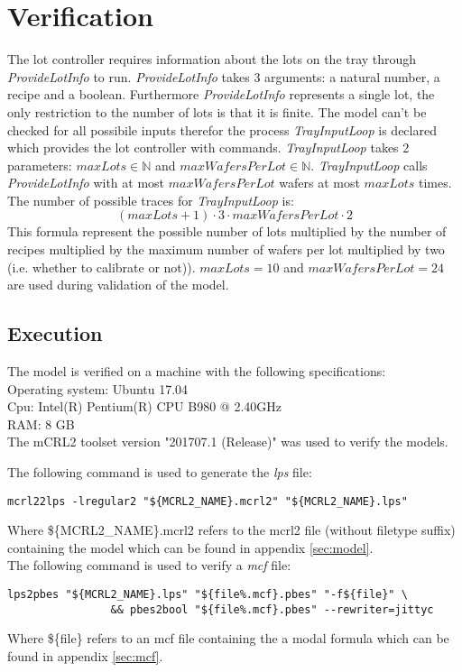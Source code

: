 \section{Verification}\label{sec:results}
The lot controller requires information about the lots on the tray through \textit{ProvideLotInfo} to run. \textit{ProvideLotInfo} takes 3 arguments: a natural number, a recipe and a boolean. Furthermore \textit{ProvideLotInfo} represents a single lot, the only restriction to the number of lots is that it is finite. The model can't be checked for all possibile inputs therefor the process \textit{TrayInputLoop} is declared which provides the lot controller with  commands. \textit{TrayInputLoop} takes 2 parameters: $\mathit{maxLots} \in \mathbb{N}$ and $\mathit{maxWafersPerLot} \in \mathbb{N}$. \textit{TrayInputLoop} calls \textit{ProvideLotInfo} with at most $\mathit{maxWafersPerLot}$ wafers at most $\mathit{maxLots}$ times. The number of possible traces for \textit{TrayInputLoop} is:
$$(\mathit{maxLots}+1) \cdot 3 \cdot \mathit{maxWafersPerLot} \cdot 2$$
This formula represent the possible number of lots multiplied by the number of recipes multiplied by the maximum number of wafers per lot multiplied by two (i.e. whether to calibrate or not)). $\mathit{maxLots} = 10$ and $\mathit{maxWafersPerLot} = 24$ are used during validation of the model.

\subsection{Execution}
The model is verified on a machine with the following specifications:\\
Operating system: Ubuntu 17.04\\
Cpu: Intel(R) Pentium(R) CPU B980 @ 2.40GHz\\
RAM: 8 GB\\

The mCRL2 toolset version "201707.1 (Release)" was used to verify the models.

The following command is used to generate the \textit{lps} file:\\
\begin{lstlisting}[style=sh,caption={mcf2lps}] 
mcrl22lps -lregular2 "${MCRL2_NAME}.mcrl2" "${MCRL2_NAME}.lps"
\end{lstlisting}
Where \$\{MCRL2\_NAME\}.mcrl2 refers to the mcrl2 file (without filetype suffix) containing the model which can be found in appendix \ref{sec:model}.\\
The following command is used to verify a \textit{mcf} file:\\
\begin{lstlisting}[style=sh,caption={mcf check}] 
lps2pbes "${MCRL2_NAME}.lps" "${file%.mcf}.pbes" "-f${file}" \
                && pbes2bool "${file%.mcf}.pbes" --rewriter=jittyc
\end{lstlisting}
Where \$\{file\} refers to an mcf file containing the a modal formula which can be found in appendix \ref{sec:mcf}.\\
